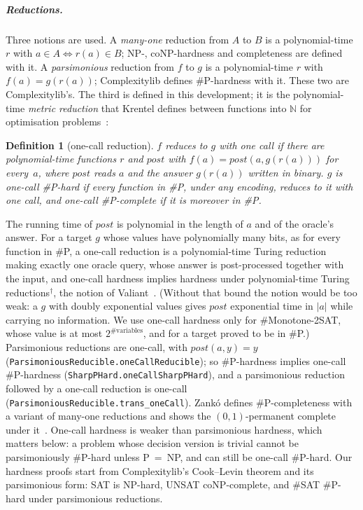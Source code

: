 \documentclass[pdflatex,sn-mathphys-num]{sn-jnl}
\theoremstyle{thmstyleone}
\theoremstyle{thmstylethree}
\newtheorem{definition}[theorem]{Definition}
\newcommand{\informal}{\ensuremath{^{\dagger}}}
\begin{document}
\subparagraph*{Reductions.}
Three notions are used. A \emph{many-one} reduction from $A$ to $B$ is a polynomial-time $r$
with $a \in A \iff r(a) \in B$; NP-, coNP-hardness and completeness are defined with it. A
\emph{parsimonious} reduction from $f$ to $g$ is a polynomial-time $r$ with $f(a) = g(r(a))$;
Complexitylib defines \#P-hardness with it. These two are Complexitylib's. The third is defined
in this development; it is the polynomial-time \emph{metric reduction} that Krentel defines
between functions into $\mathbb{N}$ for optimisation problems~\cite{Krentel1988}:
\begin{definition}[one-call reduction]
\label{def:onecall}
$f$ reduces to $g$ with one call if there are polynomial-time functions $r$ and
$\mathit{post}$ with $f(a) = \mathit{post}(a, g(r(a)))$ for every~$a$, where $\mathit{post}$
reads $a$ and the answer $g(r(a))$ written in binary. $g$ is \emph{one-call \#P-hard} if every
function in \#P, under any encoding, reduces to it with one call, and \emph{one-call
\#P-complete} if it is moreover in \#P.
\end{definition}
The running time of $\mathit{post}$ is polynomial in the length of $a$ and of the oracle's
answer. For a target $g$ whose values have polynomially many bits, as for every function in
\#P, a one-call reduction is a polynomial-time Turing reduction making exactly one oracle query,
whose answer is post-processed together with the input, and one-call hardness implies hardness
under polynomial-time Turing reductions\informal, the notion of
Valiant~\cite{Valiant1979enumeration}. (Without that bound the notion would be too weak: a $g$
with doubly exponential values gives $\mathit{post}$ exponential time in $|a|$ while carrying no
information. We use one-call hardness only for \#Monotone-2SAT, whose value is at most
$2^{\#\text{variables}}$, and for a target proved to be in \#P.) Parsimonious reductions are
one-call, with $\mathit{post}(a, y) = y$ (\lstinline{ParsimoniousReducible.oneCallReducible});
so \#P-hardness implies one-call \#P-hardness (\lstinline{SharpPHard.oneCallSharpPHard}), and a
parsimonious reduction followed by a one-call reduction is one-call
(\lstinline{ParsimoniousReducible.trans_oneCall}).
Zank\'o defines \#P-completeness with a variant of many-one reductions and shows the
$(0,1)$-permanent complete under it~\cite{Zanko1991}. One-call hardness is weaker than parsimonious
hardness, which matters below: a problem whose decision version
is trivial cannot be parsimoniously \#P-hard unless P~=~NP, and can still be one-call
\#P-hard.
Our hardness proofs start from Complexitylib's Cook--Levin theorem and its parsimonious form:
SAT is NP-hard, UNSAT coNP-complete, and \#SAT \#P-hard under parsimonious reductions.
\end{document}
